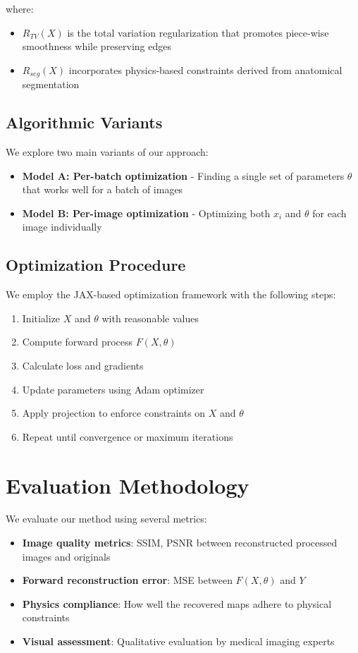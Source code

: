 \documentclass[nomenclature, english, bibtex]{kththesis}
\numberwithin{listing}{chapter}
\begin{document}
where:
\begin{itemize}
    \item $R_{TV}(X)$ is the total variation regularization that promotes piece-wise smoothness while preserving edges
    \item $R_{seg}(X)$ incorporates physics-based constraints derived from anatomical segmentation
\end{itemize}

\subsection{Algorithmic Variants}
We explore two main variants of our approach:
\begin{itemize}
    \item \textbf{Model A: Per-batch optimization} - Finding a single set of parameters $\theta$ that works well for a batch of images
    \item \textbf{Model B: Per-image optimization} - Optimizing both $x_i$ and $\theta$ for each image individually
\end{itemize}

\subsection{Optimization Procedure}
We employ the JAX-based optimization framework with the following steps:
\begin{enumerate}
    \item Initialize $X$ and $\theta$ with reasonable values
    \item Compute forward process $F(X, \theta)$
    \item Calculate loss and gradients
    \item Update parameters using Adam optimizer
    \item Apply projection to enforce constraints on $X$ and $\theta$
    \item Repeat until convergence or maximum iterations
\end{enumerate}

\section{Evaluation Methodology}
We evaluate our method using several metrics:
\begin{itemize}
    \item \textbf{Image quality metrics}: SSIM, PSNR between reconstructed processed images and originals
    \item \textbf{Forward reconstruction error}: MSE between $F(X, \theta)$ and $Y$
    \item \textbf{Physics compliance}: How well the recovered maps adhere to physical constraints
    \item \textbf{Visual assessment}: Qualitative evaluation by medical imaging experts
\end{itemize}
\end{document}
